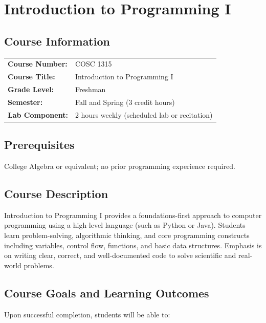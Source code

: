 \documentclass[12pt,oneside]{book}
\begin{document}
\chapter{Introduction to Programming I}

\section{Course Information}

\begin{tabular}{ll}
\textbf{Course Number:} & COSC 1315 \\
\textbf{Course Title:} & Introduction to Programming I \\
\textbf{Grade Level:} & Freshman \\
\textbf{Semester:} & Fall and Spring (3 credit hours) \\
\textbf{Lab Component:} & 2 hours weekly (scheduled lab or recitation) \\
\end{tabular}

\section{Prerequisites}

College Algebra or equivalent; no prior programming experience required.

\section{Course Description}

Introduction to Programming I provides a foundations-first approach to computer programming using a high-level language (such as Python or Java). Students learn problem-solving, algorithmic thinking, and core programming constructs including variables, control flow, functions, and basic data structures. Emphasis is on writing clear, correct, and well-documented code to solve scientific and real-world problems.

\section{Course Goals and Learning Outcomes}

Upon successful completion, students will be able to:
\end{document}
